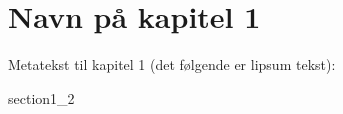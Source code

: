 \documentclass[class=report, crop=false]{standalone}
\begin{document}
    \chapter{Navn på kapitel 1}
    \label{kapitel1}
    Metatekst til kapitel 1 (det følgende er lipsum tekst): 

    {section1_2}
\end{document}
